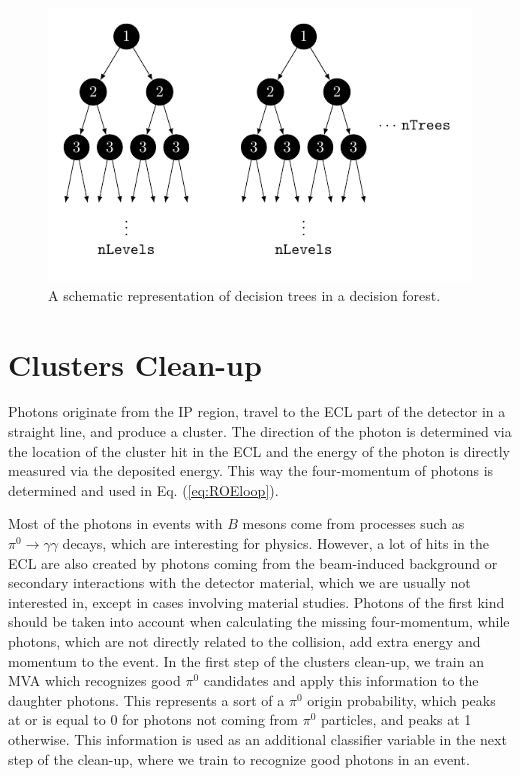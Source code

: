 \begin{figure}[H]
	\centering
	\captionsetup{width=0.8\linewidth}
	\includegraphics[scale=1]{texfig/BDT_forest}
	\caption{A schematic representation of decision trees in a decision forest.}
	\label{fig:BDT_forest}
\end{figure}


\section{Clusters Clean-up}

Photons originate from the IP region, travel to the ECL part of the detector in a straight line, and produce a cluster. The direction of the photon is determined via the location of the cluster hit in the ECL and the energy of the photon is directly measured via the deposited energy. This way the four-momentum of photons is determined and used in Eq. (\ref{eq:ROEloop}).

Most of the photons in events with $B$ mesons come from processes such as $\pi^0 \to \gamma \gamma$ decays, which are interesting for physics. However, a lot of hits in the ECL are also created by photons coming from the beam-induced background or secondary interactions with the detector material, which we are usually not interested in, except in cases involving material studies. Photons of the first kind should be taken into account when calculating the missing four-momentum, while photons, which are not directly related to the collision, add extra energy and momentum to the event. In the first step of the clusters clean-up, we train an MVA which recognizes good $\pi^0$ candidates and apply this information to the daughter photons. This represents a sort of a $\pi^0$ origin probability, which peaks at or is equal to 0 for photons not coming from $\pi^0$ particles, and peaks at 1 otherwise. This information is used as an additional classifier variable in the next step of the clean-up, where we train to recognize good photons in an event.

